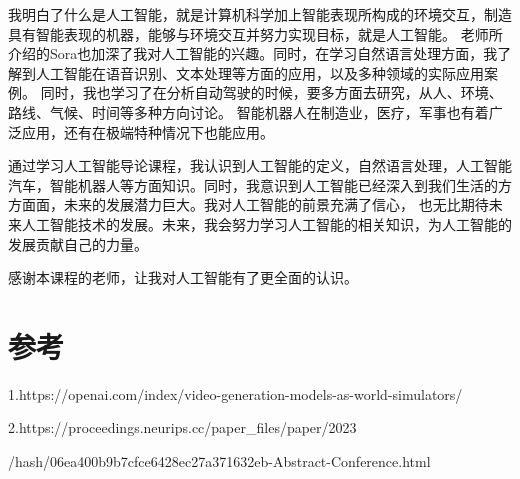 \documentclass[12pt,a4paper,oneside]{article}
\begin{document}
我明白了什么是人工智能，就是计算机科学加上智能表现所构成的环境交互，制造具有智能表现的机器，能够与环境交互并努力实现目标，就是人工智能。
老师所介绍的Sora也加深了我对人工智能的兴趣。同时，在学习自然语言处理方面，我了解到人工智能在语音识别、文本处理等方面的应用，以及多种领域的实际应用案例。
同时，我也学习了在分析自动驾驶的时候，要多方面去研究，从人、环境、路线、气候、时间等多种方向讨论。
智能机器人在制造业，医疗，军事也有着广泛应用，还有在极端特种情况下也能应用。

通过学习人工智能导论课程，我认识到人工智能的定义，自然语言处理，人工智能汽车，智能机器人等方面知识。同时，我意识到人工智能已经深入到我们生活的方方面面，未来的发展潜力巨大。我对人工智能的前景充满了信心，
也无比期待未来人工智能技术的发展。未来，我会努力学习人工智能的相关知识，为人工智能的发展贡献自己的力量。


感谢本课程的老师，让我对人工智能有了更全面的认识。

\section{参考}
1.https://openai.com/index/video-generation-models-as-world-simulators/

2.https://proceedings.neurips.cc/paper\_files/paper/2023

/hash/06ea400b9b7cfce6428ec27a371632eb-Abstract-Conference.html
\end{document}
